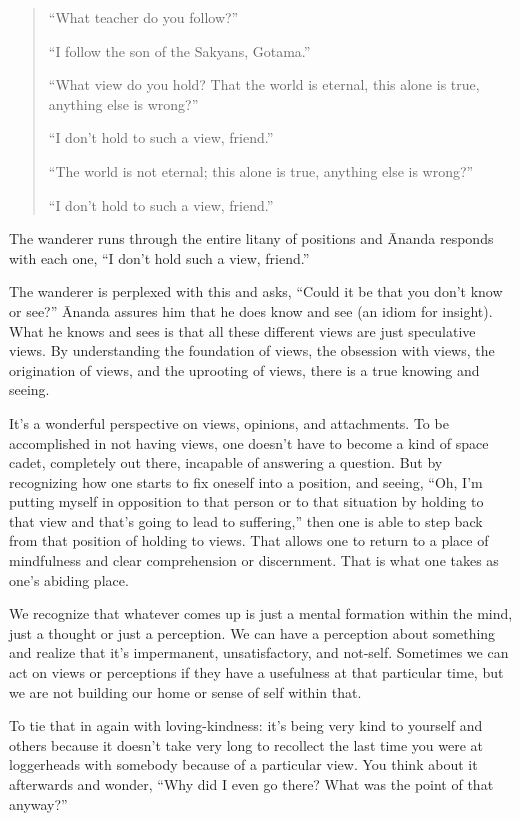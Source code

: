 \begin{quotation}
“What teacher do you follow?”

“I follow the son of the Sakyans, Gotama.”

“What view do you hold? That the world is eternal, this alone is true,
anything else is wrong?”

“I don’t hold to such a view, friend.”

“The world is not eternal; this alone is true, anything else is wrong?”

“I don’t hold to such a view, friend.”
\end{quotation}

The wanderer runs through the entire litany of positions and Ānanda
responds with each one, “I don’t hold such a view, friend.”

The wanderer is perplexed with this and asks, “Could it be that you
don’t know or see?” Ānanda assures him that he does know and see (an
idiom for insight). What he knows and sees is that all these different
views are just speculative views. By understanding the foundation of
views, the obsession with views, the origination of views, and the
uprooting of views, there is a true knowing and seeing.

It’s a wonderful perspective on views, opinions, and attachments. To be
accomplished in not having views, one doesn’t have to become a kind of
space cadet, completely out there, incapable of answering a question.
But by recognizing how one starts to fix oneself into a position, and
seeing, “Oh, I’m putting myself in opposition to that person or to that
situation by holding to that view and that’s going to lead to
suffering,” then one is able to step back from that position of holding
to views. That allows one to return to a place of mindfulness and clear
comprehension or discernment. That is what one takes as one’s abiding
place.

We recognize that whatever comes up is just a mental formation within
the mind, just a thought or just a perception. We can have a perception
about something and realize that it’s impermanent, unsatisfactory, and
not-self. Sometimes we can act on views or perceptions if they have a
usefulness at that particular time, but we are not building our home or
sense of self within that.

To tie that in again with loving-kindness: it’s being very kind to
yourself and others because it doesn’t take very long to recollect the
last time you were at loggerheads with somebody because of a particular
view. You think about it afterwards and wonder, “Why did I even go
there? What was the point of that anyway?”

